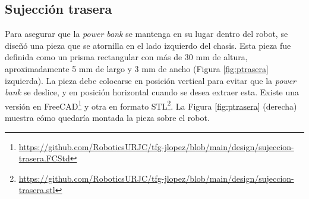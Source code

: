 \subsection{Sujección trasera}
\label{subsec:sujecciontrasera}

Para asegurar que la \textit{power bank} se mantenga en su lugar dentro del robot, se diseñó una pieza que se atornilla en el lado izquierdo del chasis. Esta pieza fue definida como un prisma rectangular con más de 30 mm de altura, aproximadamente 5 mm de largo y 3 mm de ancho (Figura \ref{fig:ptrasera} izquierda). La pieza debe colocarse en posición vertical para evitar que la \textit{power bank} se deslice, y en posición horizontal cuando se desea extraer esta. Existe una versión en FreeCAD\footnote{\url{https://github.com/RoboticsURJC/tfg-jlopez/blob/main/design/sujeccion-trasera.FCStd}} y otra en formato STL\footnote{\url{https://github.com/RoboticsURJC/tfg-jlopez/blob/main/design/sujeccion-trasera.stl}}. La Figura \ref{fig:ptrasera} (derecha) muestra cómo quedaría montada la pieza sobre el robot.



